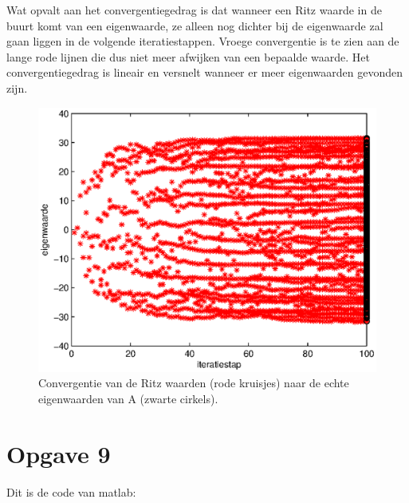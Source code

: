 \documentclass[a4paper]{article}
\newcommand{\opgave}[1]{\section*{Opgave #1}}
\begin{document}
Wat opvalt aan het convergentiegedrag is dat wanneer een Ritz waarde in de buurt komt van een eigenwaarde, ze alleen nog dichter bij de eigenwaarde zal gaan liggen in de volgende iteratiestappen. Vroege convergentie is te zien aan de lange rode lijnen die dus niet meer afwijken van een bepaalde waarde. Het convergentiegedrag is lineair en versnelt wanneer er meer eigenwaarden gevonden zijn.
\begin{figure}
\centerline{\includegraphics{pictures/opgave7.eps}}
\caption{Convergentie van de Ritz waarden (rode kruisjes) naar de echte eigenwaarden van A (zwarte cirkels).}
\label{fig:opgave7}
\end{figure}
\opgave{9}
Dit is de code van matlab:

\end{document}
